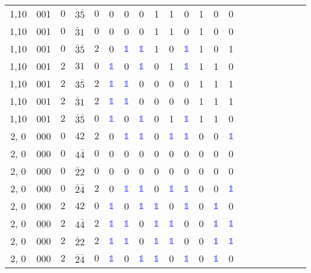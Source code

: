 \begin{longtable*}{c| cccccccccccccccccccc }
1,10& 001& $0$& $3\bar{5}$& $0$& 0& 0& 0& 1& 1& 0& 1& 0& 0\\
1,10& 001& $0$& $\bar{3}1$& $0$& 0& 0& 0& 1& 1& 0& 1& 0& 0\\
1,10& 001& $0$& $\bar{3}\bar{5}$& $2$& 0& \textcolor{blue}{$\mathds{1}$}& \textcolor{blue}{$\mathds{1}$}& 1& 0& \textcolor{blue}{$\mathds{1}$}& 1& 0& 1\\
1,10& 001& $2$& $31$& $0$& \textcolor{blue}{$\mathds{1}$}& 0& \textcolor{blue}{$\mathds{1}$}& 0& 1& \textcolor{blue}{$\mathds{1}$}& 1& 1& 0\\
1,10& 001& $2$& $3\bar{5}$& $2$& \textcolor{blue}{$\mathds{1}$}& \textcolor{blue}{$\mathds{1}$}& 0& 0& 0& 0& 1& 1& 1\\
1,10& 001& $2$& $\bar{3}1$& $2$& \textcolor{blue}{$\mathds{1}$}& \textcolor{blue}{$\mathds{1}$}& 0& 0& 0& 0& 1& 1& 1\\
1,10& 001& $2$& $\bar{3}\bar{5}$& $0$& \textcolor{blue}{$\mathds{1}$}& 0& \textcolor{blue}{$\mathds{1}$}& 0& 1& \textcolor{blue}{$\mathds{1}$}& 1& 1& 0\\
2, 0& 000& $0$& $42$& $2$& 0& \textcolor{blue}{$\mathds{1}$}& \textcolor{blue}{$\mathds{1}$}& 0& \textcolor{blue}{$\mathds{1}$}& \textcolor{blue}{$\mathds{1}$}& 0& 0& \textcolor{blue}{$\mathds{1}$}\\
2, 0& 000& $0$& $4\bar{4}$& $0$& 0& 0& 0& 0& 0& 0& 0& 0& 0\\
2, 0& 000& $0$& $\bar{2}2$& $0$& 0& 0& 0& 0& 0& 0& 0& 0& 0\\
2, 0& 000& $0$& $\bar{2}\bar{4}$& $2$& 0& \textcolor{blue}{$\mathds{1}$}& \textcolor{blue}{$\mathds{1}$}& 0& \textcolor{blue}{$\mathds{1}$}& \textcolor{blue}{$\mathds{1}$}& 0& 0& \textcolor{blue}{$\mathds{1}$}\\
2, 0& 000& $2$& $42$& $0$& \textcolor{blue}{$\mathds{1}$}& 0& \textcolor{blue}{$\mathds{1}$}& \textcolor{blue}{$\mathds{1}$}& 0& \textcolor{blue}{$\mathds{1}$}& 0& \textcolor{blue}{$\mathds{1}$}& 0\\
2, 0& 000& $2$& $4\bar{4}$& $2$& \textcolor{blue}{$\mathds{1}$}& \textcolor{blue}{$\mathds{1}$}& 0& \textcolor{blue}{$\mathds{1}$}& \textcolor{blue}{$\mathds{1}$}& 0& 0& \textcolor{blue}{$\mathds{1}$}& \textcolor{blue}{$\mathds{1}$}\\
2, 0& 000& $2$& $\bar{2}2$& $2$& \textcolor{blue}{$\mathds{1}$}& \textcolor{blue}{$\mathds{1}$}& 0& \textcolor{blue}{$\mathds{1}$}& \textcolor{blue}{$\mathds{1}$}& 0& 0& \textcolor{blue}{$\mathds{1}$}& \textcolor{blue}{$\mathds{1}$}\\
2, 0& 000& $2$& $\bar{2}\bar{4}$& $0$& \textcolor{blue}{$\mathds{1}$}& 0& \textcolor{blue}{$\mathds{1}$}& \textcolor{blue}{$\mathds{1}$}& 0& \textcolor{blue}{$\mathds{1}$}& 0& \textcolor{blue}{$\mathds{1}$}& 0\\

\end{longtable*}
